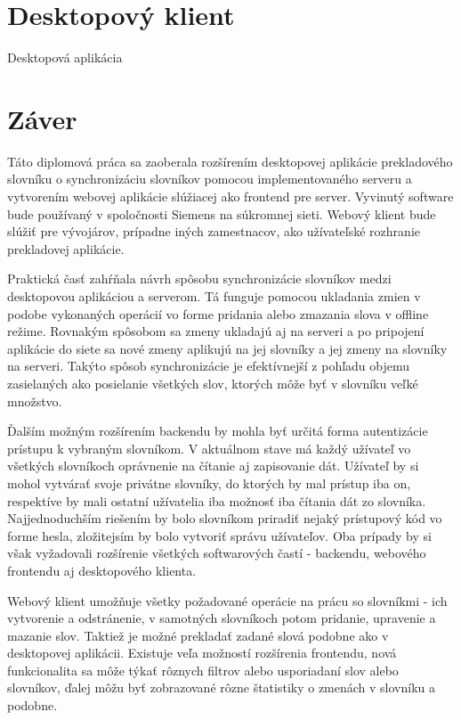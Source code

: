 \documentclass[
  digital, %
  table,   %
  lof,     %
  lot,     %
]{fithesis3}
\begin{document}
\chapter{Desktopový klient}

Desktopová aplikácia

\chapter{Záver}
Táto diplomová práca sa zaoberala rozšírením desktopovej aplikácie prekladového slovníku o synchronizáciu slovníkov pomocou implementovaného serveru a vytvorením webovej aplikácie slúžiacej ako frontend pre server. Vyvinutý software bude používaný v spoločnosti Siemens na súkromnej sieti. Webový klient bude slúžiť pre vývojárov, prípadne iných zamestnacov, ako užívateľské rozhranie prekladovej aplikácie.

Praktická časť zahŕňala návrh spôsobu synchronizácie slovníkov medzi desktopovou aplikáciou a serverom. Tá funguje pomocou ukladania zmien v podobe vykonaných operácií vo forme pridania alebo zmazania slova v offline režime. Rovnakým spôsobom sa zmeny ukladajú aj na serveri a po pripojení aplikácie do siete sa nové zmeny aplikujú na jej slovníky a jej zmeny na slovníky na serveri. Takýto spôsob synchronizácie je efektívnejší z pohľadu objemu zasielaných ako posielanie všetkých slov, ktorých môže byť v slovníku veľké množstvo.

Ďalším možným rozšírením backendu by mohla byť určitá forma autentizácie prístupu k vybraným slovníkom. V aktuálnom stave má každý užívateľ vo všetkých slovníkoch oprávnenie na čítanie aj zapisovanie dát. Užívateľ by si mohol vytvárať svoje privátne slovníky, do ktorých by mal prístup iba on, respektíve by mali ostatní užívatelia iba možnosť iba čítania dát zo slovníka. Najjednoduchším riešením by bolo slovníkom priradiť nejaký prístupový kód vo forme hesla, zložitejsím by bolo vytvoriť správu užívateľov. Oba prípady by si však vyžadovali rozšírenie všetkých softwarových častí - backendu, webového frontendu aj desktopového klienta.

Webový klient umožňuje všetky požadované operácie na prácu so slovníkmi - ich vytvorenie a odstránenie, v samotných slovníkoch potom pridanie, upravenie a mazanie slov. Taktiež je možné prekladať zadané slová podobne ako v desktopovej aplikácii. Existuje veľa možností rozšírenia frontendu, nová funkcionalita sa môže týkať rôznych filtrov alebo usporiadaní slov alebo slovníkov, ďalej môžu byť zobrazované rôzne štatistiky o zmenách v slovníku a podobne.
\end{document}
